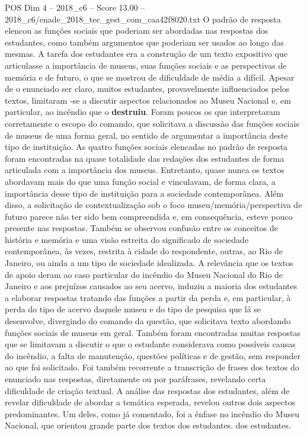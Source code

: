 \begin{textsample}{POS Dim 4 – 2018\_c6 – Score 13.00 – 2018\_c6/enade\_2018\_tec\_gest\_com\_caa42f8020.txt}
O padrão de resposta elencou as funções sociais que poderiam ser abordadas nas respostas dos estudantes, como também argumentos que poderiam ser usados ao longo das mesmas.
A tarefa dos estudantes era a construção de um texto expositivo que articulasse a importância de museus, suas funções sociais e as perspectivas de memória e de futuro, o que se mostrou de dificuldade de média a difícil.
Apesar de o enunciado ser claro, muitos estudantes, provavelmente influenciados pelos textos, limitaram -se a discutir aspectos relacionados ao Museu Nacional e, em particular, ao incêndio que o \textbf{destruiu}.
Foram poucos os que interpretaram corretamente o escopo do comando, que solicitava a discussão das funções sociais de museus de uma forma geral, no sentido de argumentar a importância deste tipo de instituição.
As quatro funções sociais elencadas no padrão de resposta foram encontradas na quase totalidade das redações dos estudantes de forma articulada com a importância dos museus.
Entretanto, quase nunca os textos abordavam mais do que uma função social e vinculavam, de forma clara, a importância desse tipo de instituição para a sociedade contemporânea.
Além disso, a solicitação de contextualização sob o foco museu/memória/perspectiva de futuro parece não ter sido bem compreendida e, em consequência, esteve pouco presente nas respostas.
Também se observou confusão entre os conceitos de história e memória e uma visão estreita do significado de sociedade contemporânea, às vezes, restrita à cidade do respondente, outras, ao Rio de Janeiro, ou ainda a um tipo de sociedade idealizada.
A relevância que os textos de apoio deram ao caso particular do incêndio do Museu Nacional do Rio de Janeiro e aos prejuízos causados ao seu acervo, induziu a maioria dos estudantes a elaborar respostas tratando das funções a partir da perda e, em particular, à perda do tipo de acervo daquele museu e do tipo de pesquisa que lá se desenvolve, divergindo do comando da questão, que solicitava texto abordando funções sociais de museus em geral.
Também foram encontradas muitas respostas que se limitavam a discutir o que o estudante considerava como possíveis causas do incêndio, a falta de manutenção, questões políticas e de gestão, sem responder ao que foi solicitado.
Foi também recorrente a transcrição de frases dos textos do enunciado nas respostas, diretamente ou por paráfrases, revelando certa dificuldade de criação textual.
A análise das respostas dos estudantes, além de revelar dificuldade de abordar a temática esperada, revelou outros dois aspectos predominantes.
Um deles, como já comentado, foi a ênfase no incêndio do Museu Nacional, que orientou grande parte dos textos dos estudantes. dos estudantes.

\end{textsample}
